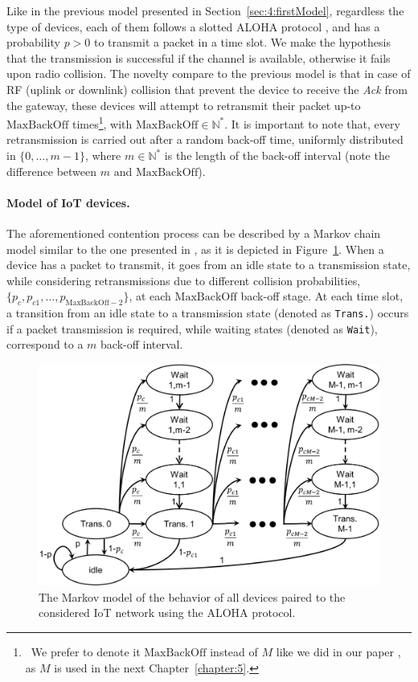 Like in the previous model presented in Section~\ref{sec:4:firstModel},
regardless the type of devices, each of them follows a slotted ALOHA protocol \cite{Roberts75}, and has a probability $p>0$ to transmit a packet in a time slot.
We make the hypothesis that the transmission is successful if the channel is available, otherwise it fails upon radio collision.
The novelty compare to the previous model is that
in case of RF (uplink or downlink) collision that prevent the device to receive the \emph{Ack} from the gateway,
these devices will attempt to retransmit their packet up-to $\mathrm{MaxBackOff}$ times\footnote{~We prefer to denote it $\mathrm{MaxBackOff}$ instead of $M$ like we did in our paper \cite{Bonnefoi2019WCNC}, as $M$ is used in the next Chapter~\ref{chapter:5}.},
with $\mathrm{MaxBackOff} \in\mathbb{N}^*$.
It is important to note that, every retransmission is carried out after a random back-off time, uniformly distributed in $\{0, \dots, m-1\}$, where $m \in\mathbb{N}^*$ is the length of the back-off interval
(note the difference between $m$ and $\mathrm{MaxBackOff}$).


\paragraph{Model of IoT devices.}

The aforementioned contention process can be described by a Markov chain model \cite{Norris98} similar to the one presented in \cite{Yang12}, as it is depicted in Figure~\ref{fig:43:Markov_model}.
When a device has a packet to transmit, it goes from an idle state to a transmission state, while considering retransmissions due to different collision probabilities, $\{p_{c}, p_{c1}, \dots, p_{\mathrm{MaxBackOff}-2} \}$, at each $\mathrm{MaxBackOff}$ back-off stage.
At each time slot, a transition from an idle state to a transmission state (denoted as \texttt{Trans.}) occurs if a packet transmission is required, while waiting states (denoted as \texttt{Wait}), correspond to a $m$ back-off interval.

\begin{figure}[!h]
	\centering
	\includegraphics[width=0.70\linewidth]{Markov_model.eps}
	\caption{The Markov model of the behavior of all devices paired to the considered IoT network using the ALOHA protocol.}
	\label{fig:43:Markov_model}
\end{figure}

